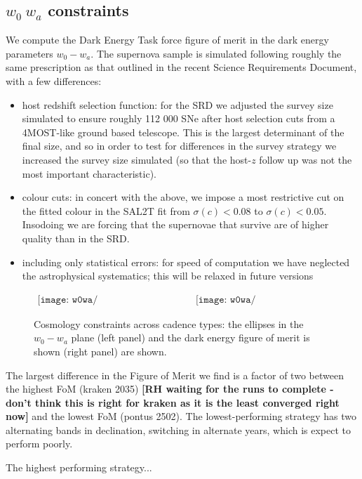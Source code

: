 \subsection{$w_0~w_a$ constraints}

We compute the Dark Energy Task force figure of merit in the dark energy parameters $w_0-w_a.$
The supernova sample is simulated following roughly the same prescription as that outlined in the recent Science Requirements Document, with a few differences:
\begin{itemize}
\item host redshift selection function: for the SRD we adjusted the survey size simulated to ensure roughly 112 000 SNe after host selection cuts from a 4MOST-like ground based telescope. This is the largest determinant of the final size, and so in order to test for differences in the survey strategy we increased the survey size simulated (so that the host-$z$ follow up was not the most important characteristic).
\item colour cuts: in concert with the above, we impose a most restrictive cut on the fitted colour in the SAL2T fit from $\sigma(c) < 0.08$ to $\sigma(c) < 0.05.$ Insodoing we are forcing that the supernovae that survive are of higher quality than in the SRD.
\item including only statistical errors: for speed of computation we have neglected the astrophysical systematics; this will be relaxed in future versions
\end{itemize}




\begin{figure}
  \begin{center}
$\begin{array}{cc} 
    \texttt{[image: w0wa/FM\_plot\_cadence\_updated.png]} &
    \texttt{[image: w0wa/FoM\_cadence\_updated.png]}
\end{array}$
    \caption{Cosmology constraints across cadence types: the ellipses in the $w_0-w_a$ plane (left panel) and the dark energy figure of merit is shown (right panel) are shown. 
    \label{fig:snfom}}
  \end{center}
\end{figure}

The largest difference in the Figure of Merit we find is a factor of two between the highest FoM (kraken 2035) \textbf{[RH waiting for the runs to complete - don't think this is right for kraken as it is the least converged right now]} and the lowest FoM (pontus 2502). The lowest-performing strategy has two alternating bands in declination, switching in alternate years, which is expect to perform poorly. 

The highest performing strategy...
